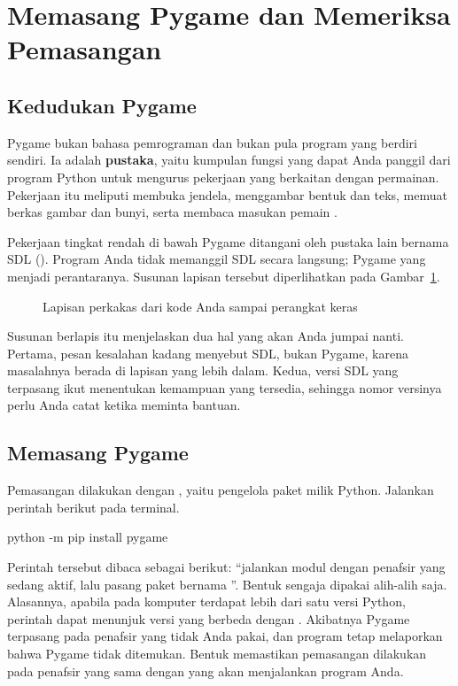 \section{Memasang Pygame dan Memeriksa Pemasangan}
\label{sec:memasang-pygame}

\subsection{Kedudukan Pygame}

Pygame bukan bahasa pemrograman dan bukan pula program yang berdiri sendiri.
Ia adalah \textbf{pustaka}, yaitu kumpulan fungsi yang dapat Anda panggil dari
program Python untuk mengurus pekerjaan yang berkaitan dengan permainan.
Pekerjaan itu meliputi membuka jendela, menggambar bentuk dan teks, memuat
berkas gambar dan bunyi, serta membaca masukan pemain \cite{pygame-docs}.

Pekerjaan tingkat rendah di bawah Pygame ditangani oleh pustaka lain bernama
SDL (). Program Anda tidak memanggil SDL
secara langsung; Pygame yang menjadi perantaranya. Susunan lapisan tersebut
diperlihatkan pada Gambar~\ref{fig:lapisan-perkakas}.

\begin{figure}[htbp]
\centering

\caption{Lapisan perkakas dari kode Anda sampai perangkat keras}
\label{fig:lapisan-perkakas}
\end{figure}

Susunan berlapis itu menjelaskan dua hal yang akan Anda jumpai nanti. Pertama,
pesan kesalahan kadang menyebut SDL, bukan Pygame, karena masalahnya berada di
lapisan yang lebih dalam. Kedua, versi SDL yang terpasang ikut menentukan
kemampuan yang tersedia, sehingga nomor versinya perlu Anda catat ketika
meminta bantuan.

\subsection{Memasang Pygame}

Pemasangan dilakukan dengan , yaitu pengelola paket milik Python.
Jalankan perintah berikut pada terminal.

\begin{kodekeluaran}
python -m pip install pygame
\end{kodekeluaran}

Perintah tersebut dibaca sebagai berikut: ``jalankan modul  dengan
penafsir  yang sedang aktif, lalu pasang paket bernama
''. Bentuk  sengaja dipakai alih-alih
 saja. Alasannya, apabila pada komputer terdapat lebih dari satu
versi Python, perintah  dapat menunjuk versi yang berbeda dengan
. Akibatnya Pygame terpasang pada penafsir yang tidak Anda pakai,
dan program tetap melaporkan bahwa Pygame tidak ditemukan. Bentuk
 memastikan pemasangan dilakukan pada penafsir yang sama
dengan yang akan menjalankan program Anda.

